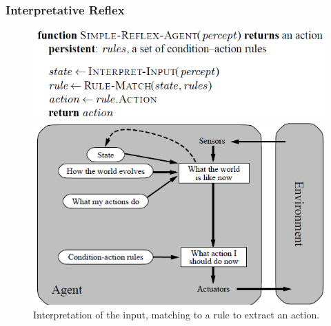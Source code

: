\documentclass{article}
\begin{document}
\subsubsection{Interpretative Reflex}
\begin{figure}[h!]
\includegraphics[scale=0.5]{2.png}
\includegraphics[scale=0.5]{3.png}\\
Interpretation of the input, matching to a rule to extract an action.
\end{figure}
\end{document}
